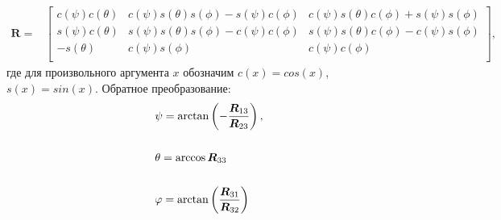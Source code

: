 \small
\begin{equation*} \label{eq:eul_to_rotmx}
\begin{aligned}
\bm{R} =
&\begin{bmatrix}
c(\psi)c(\theta) & c(\psi)s(\theta)s(\phi) - s(\psi)c(\phi) & c(\psi)s(\theta)c(\phi) + s(\psi)s(\phi) \\
s(\psi)c(\theta) & s(\psi)s(\theta)s(\phi) - c(\psi)c(\phi) & s(\psi)s(\theta)c(\phi) - c(\psi)s(\phi) \\
-s(\theta)         & c(\psi)s(\phi)                                 & c(\psi)c(\phi)\\
\end{bmatrix},
\end{aligned}
\end{equation*}
\normalsize
где для произвольного аргумента $x$ обозначим $c(x) = cos(x)$, $s(x) = sin(x)$. Обратное преобразование:
\begin{equation} \label{eq:rotmx_to_eul}
\begin{aligned}
&\psi  = \arctan\left( { - \frac{{{{\bm{R}}_{13}}}}{{{{\bm{R}}_{23}}}}} \right),
\\
\vspace{3mm}
\\
&{\theta  = \arccos  {{{\bm{R}}_{33}}} }
\\
\vspace{3mm}
\\
&\varphi  = \arctan\left( {\frac{{{{\bm{R}}_{31}}}}{{{{\bm{R}}_{32}}}}} \right)
\end{aligned}
\end{equation}

